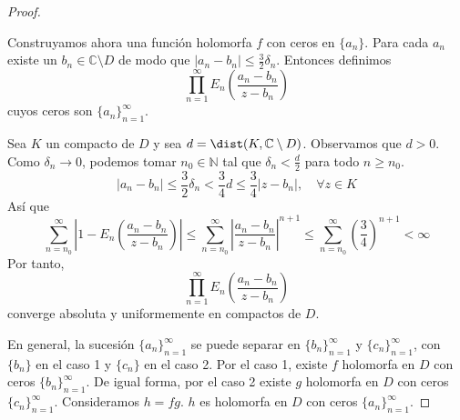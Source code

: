 \begin{proof}
\begin{enumerate}
              Construyamos ahora una función holomorfa $f$ con ceros en $\{a_n\}$.
              Para cada $a_n$ existe un $b_n \in \mathbb{C} \setminus D$ de modo que $|a_n-b_n| \leq \frac{3}{2}\delta_n$.
              Entonces definimos
              $$\prod_{n=1}^\infty E_n\left(\frac{a_n-b_n}{z-b_n}\right)$$
              cuyos ceros son $\{a_n\}_{n=1}^\infty$.

              Sea $K$ un compacto de $D$ y sea $d = \dist(K, \mathbb{C} \setminus D)$.
              Observamos que $d > 0$.
              Como $\delta_n \to 0$, podemos tomar $n_0 \in \mathbb{N}$ tal que $\delta_n < \frac{d}{2}$ para todo $n \geq n_0$.
              $$|a_n-b_n| \leq \frac{3}{2}\delta_n < \frac{3}{4}d \leq \frac{3}{4}|z-b_n|, \quad \forall z \in K$$
              Así que
              $$\sum_{n=n_0}^\infty \left|1-E_n\left(\frac{a_n-b_n}{z-b_n}\right)\right| \leq \sum_{n=n_0}^\infty \left|\frac{a_n-b_n}{z-b_n}\right|^{n+1} \leq \sum_{n=n_0}^\infty \left(\frac{3}{4}\right)^{n+1} < \infty$$
              Por tanto,
              $$\prod_{n=1}^\infty E_n\left(\frac{a_n-b_n}{z-b_n}\right)$$
              converge absoluta y uniformemente en compactos de $D$.
    \end{enumerate}

    En general, la sucesión $\{a_n\}_{n=1}^\infty$ se puede separar en $\{b_n\}_{n=1}^\infty$ y $\{c_n\}_{n=1}^\infty$, con $\{b_n\}$ en el caso 1 y $\{c_n\}$ en el caso 2.
    Por el caso 1, existe $f$ holomorfa en $D$ con ceros $\{b_n\}_{n=1}^\infty$.
    De igual forma, por el caso 2 existe $g$ holomorfa en $D$ con ceros $\{c_n\}_{n=1}^\infty$.
    Consideramos $h = fg$.
    $h$ es holomorfa en $D$ con ceros $\{a_n\}_{n=1}^\infty$.
\end{proof}